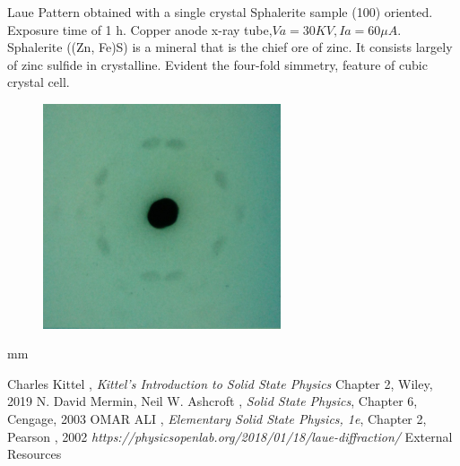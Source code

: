 \documentclass[12pt]{article}
\begin{document}
\begin{enumerate}
Laue Pattern obtained with a single crystal Sphalerite sample (100) oriented. Exposure time of 1 h. Copper anode x-ray tube,$ Va = 30 KV, Ia = 60 \mu A$. Sphalerite ((Zn, Fe)S) is a mineral that is the chief ore of zinc. It consists largely of zinc sulfide in crystalline. Evident the four-fold simmetry, feature of cubic crystal cell.
\begin{figure}[h!]
  \centering \includegraphics[width= 7cm] {zinc.jpg}
\end{figure}
\end{enumerate}

 mm
\begin{thebibliography}{9}
  Charles Kittel ,
  \textit {Kittel's Introduction to Solid State Physics}
  Chapter 2,
  Wiley,
  2019 
   N. David Mermin, Neil W. Ashcroft ,
   \textit {Solid State Physics},
   Chapter 6,
   Cengage,
   2003
  OMAR ALI ,
 \textit {Elementary Solid State Physics, 1e},
 Chapter 2,
  Pearson ,
  2002
 \textit{https://physicsopenlab.org/2018/01/18/laue-diffraction/}
 External Resources
\end{thebibliography}  
\end{document}
